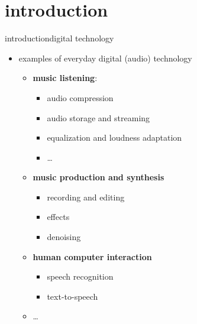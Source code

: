 


\subtitle{Part 2: Introduction}


	

\section{introduction}
\begin{frame}{introduction}{digital technology}
    \begin{itemize}
        \item   examples of everyday digital (audio) technology
            \begin{itemize}
                \item   \textbf{music listening}:
                    \begin{itemize}
                        \item   audio compression
                        \item   audio storage and streaming
                        \item   equalization and loudness adaptation
                        \item   \ldots
                    \end{itemize}
                \smallskip
                \item   \textbf{music production and synthesis}
                    \begin{itemize}
                        \item   recording and editing
                        \item   effects
                        \item   denoising
                    \end{itemize}
                \smallskip
                \item   \textbf{human computer interaction}
                    \begin{itemize}
                        \item   speech recognition
                        \item   text-to-speech
                    \end{itemize}
                \smallskip
                \item   \ldots
            \end{itemize}
    \end{itemize}
\end{frame}

